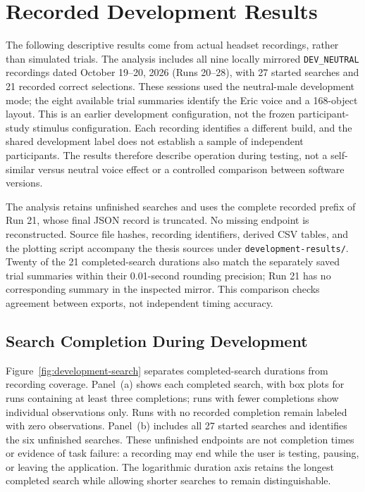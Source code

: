 \section{Recorded Development Results}
\label{sec:development-results}
The following descriptive results come from actual headset recordings, rather than simulated trials. The analysis includes all nine locally mirrored \texttt{DEV\_NEUTRAL} recordings dated October 19--20, 2026 (Runs 20--28), with 27 started searches and 21 recorded correct selections. These sessions used the neutral-male development mode; the eight available trial summaries identify the Eric voice and a 168-object layout. This is an earlier development configuration, not the frozen participant-study stimulus configuration. Each recording identifies a different build, and the shared development label does not establish a sample of independent participants. The results therefore describe operation during testing, not a self-similar versus neutral voice effect or a controlled comparison between software versions.

The analysis retains unfinished searches and uses the complete recorded prefix of Run 21, whose final JSON record is truncated. No missing endpoint is reconstructed. Source file hashes, recording identifiers, derived CSV tables, and the plotting script accompany the thesis sources under \texttt{development-results/}. Twenty of the 21 completed-search durations also match the separately saved trial summaries within their 0.01-second rounding precision; Run 21 has no corresponding summary in the inspected mirror. This comparison checks agreement between exports, not independent timing accuracy.

\subsection{Search Completion During Development}
Figure~\ref{fig:development-search} separates completed-search durations from recording coverage. Panel~(a) shows each completed search, with box plots for runs containing at least three completions; runs with fewer completions show individual observations only. Runs with no recorded completion remain labeled with zero observations. Panel~(b) includes all 27 started searches and identifies the six unfinished searches. These unfinished endpoints are not completion times or evidence of task failure: a recording may end while the user is testing, pausing, or leaving the application. The logarithmic duration axis retains the longest completed search while allowing shorter searches to remain distinguishable.

